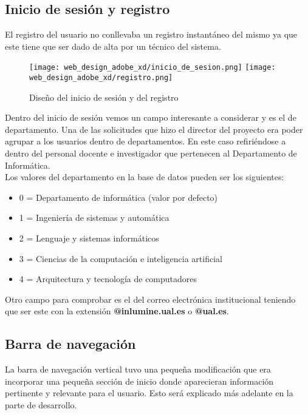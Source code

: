 \subsection{Inicio de sesión y registro}

El registro del usuario no conllevaba un registro instantáneo del mismo ya que este tiene que ser dado de alta por un técnico del sistema.

\begin{figure}
    \begin{center}
        \texttt{[image: web\_design\_adobe\_xd/inicio\_de\_sesion.png]}
        \texttt{[image: web\_design\_adobe\_xd/registro.png]}
        \caption{Diseño del inicio de sesión y del registro}
    \end{center}
\end{figure}

Dentro del inicio de sesión vemos un campo interesante a considerar y es el de departamento. Una de las solicitudes que hizo el director del proyecto era poder agrupar a los usuarios dentro de departamentos. En este caso refiriéndose a dentro del personal docente e investigador que pertenecen al Departamento de Informática.
\\Los valores del departamento en la base de datos pueden ser los siguientes:

\begin{itemize}
    \item 0 = Departamento de informática (valor por defecto)
    \item 1 = Ingeniería de sistemas y automática
    \item 2 = Lenguaje y sistemas informáticos
    \item 3 = Ciencias de la computación e inteligencia artificial
    \item 4 = Arquitectura y tecnología de computadores
\end{itemize}

Otro campo para comprobar es el del correo electrónica institucional teniendo que ser este con la extensión \textbf{@inlumine.ual.es} o \textbf{@ual.es}.

\subsection{Barra de navegación}

La barra de navegación vertical tuvo una pequeña modificación que era incorporar una pequeña sección de inicio donde aparecieran información pertinente y relevante para el usuario. Esto será explicado más adelante en la parte de desarrollo.

